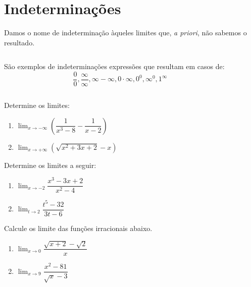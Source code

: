 \section{Indeterminações}

\begin{frame}
  \begin{definition}
    Damos o nome de indeterminação àqueles limites que, \emph{a priori}, não sabemos o resultado.
  \end{definition}
  \begin{columns}[onlytextwidth]
    \begin{column}{0.49\textwidth}
      \begin{example-highlight}
        São exemplos de indeterminações expressões que resultam em casos de:
        \begin{equation*}
          \dfrac{0}{0}, \dfrac{\infty}{\infty}, \infty-\infty, 0\cdot \infty, 0^0, \infty^0, 1^{\infty}
        \end{equation*}
      \end{example-highlight}
    \end{column}
    \begin{column}{0.49\textwidth}
    \end{column}
  \end{columns}
\end{frame}

\begin{frame}
  \begin{example}
    Determine os limites:
  \end{example}
  \begin{enumerate}
    \item $\displaystyle\lim_{x\to -\infty}\left(\dfrac{1}{x^3-8}-\dfrac{1}{x-2}\right)$
    \item$\displaystyle\lim_{x\to +\infty}(\sqrt{x^2+3x+2}-x)$
  \end{enumerate}
\end{frame}

\begin{frame}
  \begin{example}
    Determine os limites a seguir:
  \end{example}
  \begin{enumerate}
    \item $\displaystyle\lim_{x\to -2}\dfrac{x^3-3x+2}{x^2-4}$
    \item $\displaystyle\lim_{t\to 2}\dfrac{t^5-32}{3t-6}$
  \end{enumerate}
\end{frame}

\begin{frame}
  \begin{example}
    Calcule os limite das funções irracionais abaixo.
  \end{example}
  \begin{enumerate}
    \item $\displaystyle\lim_{x\to 0}\dfrac{\sqrt{x+2}-\sqrt{2}}{x}$
    \item $\displaystyle\lim_{x\to 9}\dfrac{x^2-81}{\sqrt{x}-3}$
  \end{enumerate}
\end{frame}
